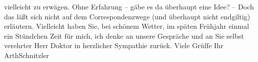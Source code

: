 \begin{ledgroupsized}[t]{13cm}
                    vielleicht zu erwägen. Ohne Erfahrung – gäbe es da{\geminationn}
                    überhaupt eine Idee? – Doch das läßt {\pb}sich nicht auf dem
                    Correspondenzwege (und überhaupt nicht endgiltig) erläutern. Vielleicht haben
                    Sie, bei schönem Wetter, im späten Frühjahr einmal ein Stündchen Zeit für mich,
                    ich denke an unsere Gespräche und an Sie selbst verehrter Herr Doktor in
                    herzlicher Sympathie zurück.\pend
           \pstart Viele Grüſſe Ihr \spacefill\mbox{ArthSchnitzler}\pend{}          \endnumbering{}\end{ledgroupsized}  \newcommand{\dateiname}{L02484}\newcommand{\titel}{Arthur Schnitzler an Robert Adam, 9. 4. 1927}\newcommand{\editorInnen}{Martin Anton Müller und Gerd-Hermann Susen}
            \footnotesize
\begin{ledgroupsized}[t]{11.5cm}
\end{ledgroupsized}
         
      